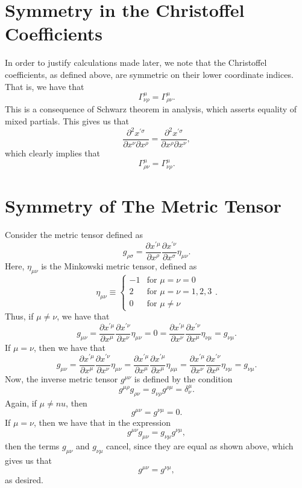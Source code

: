 \documentclass[12pt]{article}
\theoremstyle{definition}
\theoremstyle{remark}
\begin{document}
\section{Symmetry in the Christoffel Coefficients}

In order to justify calculations made later, we note that the Christoffel coefficients, as defined above, are symmetric on their lower coordinate indices.  That is, we have that 
\[
\Gamma^{ \mu }_{ \nu \rho } 
= 
\Gamma^{ \mu }_{ \rho \nu }.
\]
This is a consequence of Schwarz theorem in analysis, which asserts equality of mixed partials.  This gives us that 
\[
\frac{ \partial^2 x^{ \prime \sigma } }{ \partial x^{ \nu }  \partial x^{ \rho } } 
=
\frac{ \partial^2 x^{ \prime \sigma } }{ \partial x^{ \rho }  \partial x^{ \nu } },
\]
which clearly implies that 
\[
\Gamma_{ \rho \nu }^{ \mu } = \Gamma_{ \nu \rho }^{ \mu } .
\]




\section{Symmetry of The Metric Tensor}

Consider the metric tensor defined as 
\[
g_{ \rho \sigma } =
\frac{ \partial x^{ \prime \mu } }{ \partial x^{ \rho } } 
\frac{ \partial x^{ \prime \nu } }{ \partial x^{ \sigma } } 
\eta_{ \mu \nu } .
\]
Here, $\eta_{\mu \nu}$ is the Minkowski metric tensor, defined as
\[
\eta_{\mu \nu} 
\equiv
\begin{cases}
-1 & \text{for} \,\, \mu = \nu = 0 \\
2 & \text{for} \,\, \mu = \nu = 1,2,3 \\
0 & \text{for} \,\, \mu \neq \nu
\end{cases}.
\]
Thus, if $\mu \neq \nu$, we have that
\[
g_{ \mu \nu}
 =  
\frac{ \partial x^{ \prime \mu } }{ \partial x^{ \mu } } 
\frac{ \partial x^{ \prime \nu } }{ \partial x^{ \nu } } 
\eta_{ \mu \nu } 
=
0
=
\frac{ \partial x^{ \prime \mu } }{ \partial x^{ \nu } } 
\frac{ \partial x^{ \prime \nu } }{ \partial x^{ \mu } } 
\eta_{ \nu \mu } 
=
g_{\nu \mu}.
\]
If $\mu = \nu$, then we have that 
\[
g_{\mu \nu} 
=
\frac{ \partial x^{ \prime \mu } }{ \partial x^{ \mu } } 
\frac{ \partial x^{ \prime \nu } }{ \partial x^{ \nu } } 
\eta_{ \mu \nu } 
=
\frac{ \partial x^{ \prime \mu } }{ \partial x^{ \mu } } 
\frac{ \partial x^{ \prime \mu } }{ \partial x^{ \mu } } 
\eta_{ \mu \mu }
=
\frac{ \partial x^{ \prime \mu } }{ \partial x^{ \nu } } 
\frac{ \partial x^{ \prime \nu } }{ \partial x^{ \mu } } 
\eta_{ \nu \mu } 
=
g_{ \nu \mu} .
\]
Now, the inverse metric tensor $g^{\mu \nu}$ is defined by the condition 
\[
g^{ \mu \rho } g_{ \rho \nu } 
= 
g_{ \nu \rho } g^{ \rho \mu } 
= 
\delta_{ \nu }^{ \mu } .
\]
Again, if $\mu \neq nu$, then 
\[
g^{ \mu \nu } = g^{ \nu \mu } = 0.
\]
If $\mu = \nu$, then we have that in the expression 
\[
g^{ \mu \nu} g_{ \mu \nu } 
=
g_{\nu \mu } g^{ \nu \mu },
\]
then the terms $g_{\mu \nu}$ and $g_{\nu \mu}$ cancel, since they are equal as shown above, which gives us that 
\[
g^{ \mu \nu } = g^{ \nu \mu },
\]
as desired.  
\end{document}
